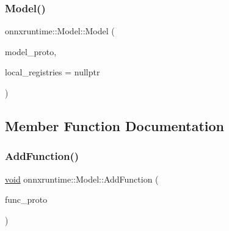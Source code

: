 \mbox{\label{classonnxruntime_1_1Model_ae64329b4d073efb3122d23b362c5b5f5}} 
\subsubsection{\texorpdfstring{Model()}{Model()}\hspace{0.1cm}{\footnotesize\ttfamily [3/3]}}
{\footnotesize\ttfamily onnxruntime\+::\+Model\+::\+Model (\begin{DoxyParamCaption}\item[{std\+::unique\+\_\+ptr$<$ O\+N\+N\+X\+\_\+\+N\+A\+M\+E\+S\+P\+A\+C\+E\+::\+Model\+Proto $>$}]{model\+\_\+proto,  }\item[{const \mbox{\hyperlink{namespaceonnxruntime_a37a91305e7190e83fa9c66117a6a4746}{I\+Onnx\+Runtime\+Op\+Schema\+Registry\+List}} $\ast$}]{local\+\_\+registries = {\ttfamily nullptr} }\end{DoxyParamCaption})\hspace{0.3cm}{\ttfamily [explicit]}}



\subsection{Member Function Documentation}
\mbox{\label{classonnxruntime_1_1Model_a602e428a4b098e7ec95f5a05144b06f5}} 
\subsubsection{\texorpdfstring{Add\+Function()}{AddFunction()}}
{\footnotesize\ttfamily \mbox{\hyperlink{mlasi_8h_a88f941d423cb2a819b70a1358982b1a6}{void}} onnxruntime\+::\+Model\+::\+Add\+Function (\begin{DoxyParamCaption}\item[{const O\+N\+N\+X\+\_\+\+N\+A\+M\+E\+S\+P\+A\+C\+E\+::\+Function\+Proto \&}]{func\+\_\+proto }\end{DoxyParamCaption})}

\mbox{\label{classonnxruntime_1_1Model_a3255fd55fde8752cc61e1d7da47b3ee2}} 
